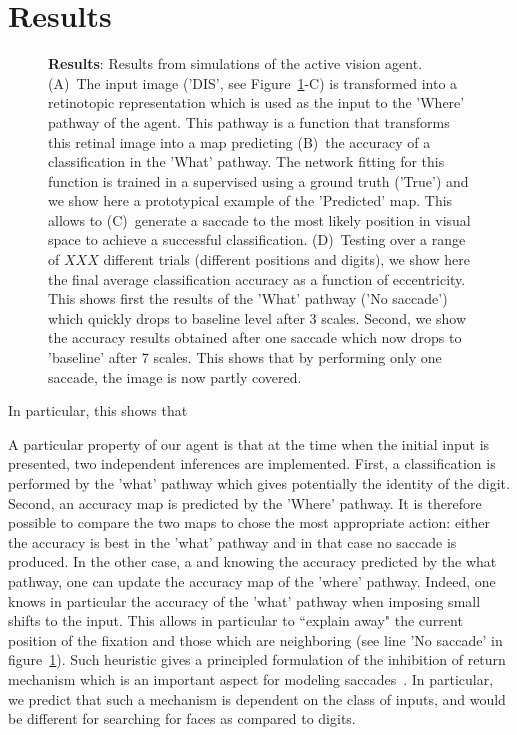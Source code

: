 \section{Results}
\label{sec:results}



\begin{figure}%
\caption{
{\bf Results}: Results from simulations of the active vision agent.
(A)~The input image ('DIS', see  Figure~\ref{fig:results}-C)  is transformed into a retinotopic representation which is used as the input to the 'Where' pathway of the agent. This pathway is a function that transforms this retinal image into a map predicting (B)~the accuracy of a classification in the 'What' pathway. The network fitting for this function is trained in a supervised using a ground truth ('True') and we show here a prototypical example of the 'Predicted' map. This allows to (C)~generate a saccade to the most likely position in visual space to achieve a successful classification. (D)~Testing over a range of $XXX$ different trials (different positions and digits), we show here the final average classification accuracy as a function of eccentricity. This shows first the results of the 'What' pathway ('No saccade') which quickly drops to baseline level after 3 scales. Second, we show the accuracy results obtained after one saccade which now drops to 'baseline' after 7 scales. This shows that by performing only one saccade, the image is now partly covered.
\label{fig:results}}%
\end{figure}%

 In particular, this shows that



A particular property of our agent is that at the time when the initial input is presented, two independent inferences are implemented. First, a classification is performed by the 'what' pathway which gives potentially the identity of the digit. Second, an accuracy map is predicted by the 'Where' pathway. It is therefore possible to compare the two maps to chose the most appropriate action: either the  accuracy is best in the 'what' pathway and in that case no saccade is produced. In the other case, a and knowing the accuracy predicted by the what pathway, one can update the accuracy map of the 'where' pathway. Indeed, one knows in particular the accuracy of the 'what' pathway when imposing small shifts to the input. This allows in particular to ``explain away" the current position of the fixation and those which are neighboring (see line 'No saccade' in figure~\ref{fig:results}). Such heuristic gives a principled formulation of the inhibition of return mechanism which is an important aspect for modeling saccades~\citep{Itti01}. In particular, we predict that such a mechanism is dependent on the class of inputs, and would be different for searching for faces as compared to digits.

